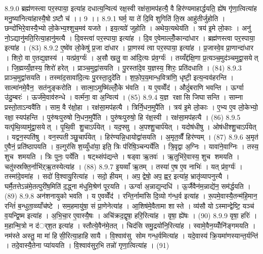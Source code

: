 8.9.0
ब्रह्म॑णस्त्वा पर॒स्पाया॒ इत्या॑ह दधात्य॒न्वित्य॑ रक्ष॒स्वी रक्ष॑सा॒मप॑हत्यै॒ वै हिर॑ण्यमाहार्द्धयति॒ ह्ये॑ष गृ॑णा॒त्वित्या॑ह मनु॒ष्या॑नित्या॑हास्यै॒षोऽष्टौ च॑ ।। 9 ।।
8.9.1
घर्म॒ या ते॑ दि॒वि शुगिति॑ ति॒स्र आहु॑तीर्जुहोति । छन्दो॑भिरे॒वास्यै॒भ्यो लो॒केभ्य॒श्शुच॒मव॑ यजते । इय॒त्यग्रे॑ जुहोति । अथेय॒त्यथेय॑ति । त्रय॑ इ॒मे लो॒काः । अनु॑ नो॒ऽद्यानु॑मति॒रित्या॒हानु॑मत्यै । दि॒वस्त्वा॑ पर॒स्पाया॒ इत्या॑ह । दि॒व ए॒वेमाल्लोँ॒कान्दा॑धार । ब्रह्म॑णस्त्वा पर॒स्पाया॒ इत्या॑ह । (83)
8.9.2
ए॒ष्वे॑व लो॒केषु॑ प्र॒जा दा॑धार । प्रा॒णस्य॑ त्वा पर॒स्पाया॒ इत्या॑ह । प्र॒जास्वे॒व प्रा॒णान्दा॑धार । शिरो॒ वा ए॒तद्य॒ज्ञस्य॑ । यत्प्र॑व॒र्ग्यः॑ । अ॒सौ खलु॒ वा आ॑दि॒त्यः प्र॑व॒र्ग्यः॑ । तय्यँद्द॑क्षि॒णा प्र॒त्यञ्च॒मुद॑ञ्चमुद्वा॒सयेत् । जि॒ह्मय्यँ॒ज्ञस्य॒ शिरो॑ हरेत् । प्राञ्च॒मुद्वा॑सयति । पु॒रस्ता॑दे॒व य॒ज्ञस्य॒ शिरः॒ प्रति॑दधाति । (84)
8.9.3
प्राञ्च॒मुद्वा॑सयति । तस्मा॑द॒सावा॑दि॒त्यः पु॒रस्ता॒दुदे॑ति । श॒फो॒प॒य॒मान्ध॒वित्रा॑णि॒ धृष्टी॒ इत्य॒न्वव॑हरन्ति । सात्मा॑नमे॒वैन॒ सत॑नुङ्करोति । सात्मा॒ऽमुष्मि॑ल्लोँ॒के भ॑वति । य ए॒वव्वेँद॑ । औदुं॑बराणि भवन्ति । ऊर्ग्वा उ॑दु॒म्बरः॑ । ऊर्ज॑मे॒वाव॑रुन्धे । वर्त्म॑ना॒ वा अ॒न्वित्य॑ । (85)
8.9.4
य॒ज्ञ रक्षासि जिघासन्ति । साम्ना प्रस्तो॒ताऽन्ववै॑ति । साम॒ वै र॑क्षो॒हा । रक्ष॑सा॒मप॑हत्यै । त्रिर्नि॒धन॒मुपै॑ति । त्रय॑ इ॒मे लो॒काः । ए॒भ्य ए॒व लो॒केभ्यो॒ रक्षा॒स्यप॑हन्ति । पुरु॑षःपुरुषो नि॒धन॒मुपै॑ति । पुरु॑षःपुरुषो॒ हि र॑क्ष॒स्वी । रक्ष॑सा॒मप॑हत्यै । (86)
8.9.5
यत्पृ॑थि॒व्यामु॑द्वा॒सयेत् । पृ॒थि॒वी शु॒चाऽर्प॑येत् । यद॒फ्सु । अ॒पश्शु॒चार्प॑येत् । यदोष॑धीषु । ओष॑धीश्शु॒चाऽर्प॑येत् । यद्वन॒स्पति॑षु । वन॒स्पतीञ्छु॒चार्प॑येत् । हिर॑ण्यन्नि॒धायोद्वा॑सयति । अ॒मृत॒व्वैँ हिर॑ण्यम् । (87)
8.9.6
अ॒मृत॑ ए॒वैनं॒ प्रति॑ष्ठापयति । व॒ल्गुर॑सि श॒य्युँधा॑या॒ इति॒ त्रिः प॑रिषि॒ञ्चन्पर्ये॑ति । त्रि॒वृद्वा अ॒ग्निः । यावा॑ने॒वाग्निः । तस्य॒ शुच शमयति । त्रिः पुनः॒ पर्ये॑ति । षट्थ्संप॑द्यन्ते । षड्वा ऋ॒तवः॑ । ऋ॒तुभि॑रे॒वास्य॒ शुच शमयति । चतु॑स्स्रक्ति॒र्नाभि॑ऱ्ऋ॒तस्येत्या॑ह । (88)
8.9.7
इ॒यव्वाँ ऋ॒तम् । तस्या॑ ए॒ष ए॒व नाभिः॑ । यत् प्र॑व॒र्ग्यः॑ । तस्मा॑दे॒वमा॑ह । सदो॑ वि॒श्वायु॒रित्या॑ह । सदो॒ हीयम् । अप॒ द्वेषो॒ अप॒ ह्वर॒ इत्या॑ह॒ भ्रातृ॑व्यापनुत्त्यै । घर्मै॒तत्तेऽन्न॑मे॒तत्पुरी॑ष॒मिति॑ द॒द्ध्ना म॑धुमि॒श्रेण॑ पूरयति । ऊर्ग्वा अ॒न्नाद्य॒न्दधि॑ । ऊ॒र्जैवैन॑म॒न्नाद्ये॑न॒ सम॑र्द्धयति । (89)
8.9.8
अन॑शनायुको भवति । य ए॒वव्वेँद॑ । रन्ति॒र्नामा॑सि दि॒व्यो ग॑न्ध॒र्व इत्या॑ह । रू॒पमे॒वास्यै॒तन्म॑हि॒मान॒ रन्तिं॑ ब॒न्धुता॒व्व्याँच॑ष्टे । सम॒हमायु॑षा॒ सं प्रा॒णेनेत्या॑ह । आ॒शिष॑मे॒वैतामा शास्ते । व्य॑सौ योऽस्मान्द्वेष्टि॒ यञ्च॑ व॒यन्द्वि॒ष्म इत्या॑ह । अ॒भि॒चा॒र ए॒वास्यै॒षः । अचि॑क्रद॒द्वृषा॒ हरि॒रित्या॑ह । वृषा॒ ह्ये॑षः । (90)
8.9.9
वृषा॒ हरिः॑ । म॒हान्मि॒त्रो न द॑र््श॒त इत्या॑ह । स्तौत्ये॒वैन॑मे॒तत् । चिद॑सि समु॒द्रयो॑नि॒रित्या॑ह । स्वामे॒वैन॒य्योँनि॑ङ्गमयति । नम॑स्ते अस्तु॒ मा मा॑ हिसी॒रित्या॒हाहिसायै । वि॒श्वाव॑सु सोम गन्ध॒र्वमित्या॑ह । यदे॒वास्य॑ क्रि॒यमा॑णस्यान्त॒र्यन्ति॑ । तदे॒वास्यै॒तेना प्या॑ययति । वि॒श्वाव॑सुर॒भि तन्नो॑ गृणा॒त्वित्या॑ह । (91)
